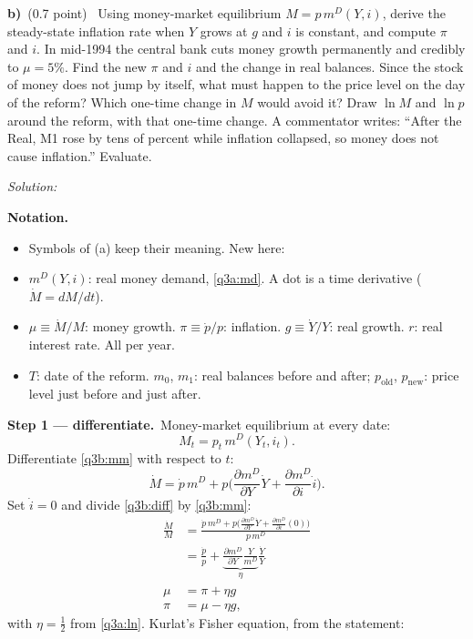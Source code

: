 \documentclass[11pt,a4paper]{article}
\newif\ifsolucoes
\newcommand{\espacoresol}{6cm}
\newcommand{\parte}[2]{\par\Needspace{6\baselineskip}\medskip\noindent\textbf{#1)}~(#2)~}
\newcommand{\resolespaco}{\ifsolucoes\else\par\textit{Solution:}\vspace{\espacoresol}\par\fi}
\newcommand{\passo}[2]{\par\smallskip\noindent\textbf{Step #1.}~#2}
\newenvironment{notacao}{\par\smallskip\noindent\textbf{Notation.}\begin{itemize}[leftmargin=1.4em,topsep=1pt,itemsep=0pt]\small}{\end{itemize}}
\begin{document}
\parte{b}{0.7 point} Using money-market equilibrium $M=p\,m^D(Y,i)$, derive the steady-state inflation rate when
$Y$ grows at $g$ and $i$ is constant, and compute $\pi$ and $i$. In mid-1994 the central bank cuts money growth
permanently and credibly to $\mu=5\%$. Find the new $\pi$ and $i$ and the change in real balances. Since the stock
of money does not jump by itself, what must happen to the price level on the day of the reform? Which one-time
change in $M$ would avoid it? Draw $\ln M$ and $\ln p$ around the reform, with that one-time change. A commentator
writes: ``After the Real, M1 rose by tens of percent while inflation collapsed, so money does not cause inflation.''
Evaluate.
\resolespaco
\begin{sol}
\begin{notacao}
\item Symbols of (a) keep their meaning. New here:
\item $m^D(Y,i)$: real money demand, \eqref{q3a:md}. A dot is a time derivative ($\dot M=dM/dt$).
\item $\mu\equiv\dot M/M$: money growth. $\pi\equiv\dot p/p$: inflation. $g\equiv\dot Y/Y$: real growth.
$r$: real interest rate. All per year.
\item $T$: date of the reform. $m_0$, $m_1$: real balances before and after; $p_{\text{old}}$, $p_{\text{new}}$:
price level just before and just after.
\end{notacao}
\passo{1 --- differentiate}{Money-market equilibrium at every date:
\begin{equation}
M_t=p_t\,m^D(Y_t,i_t). \label{q3b:mm}
\end{equation}
Differentiate \eqref{q3b:mm} with respect to $t$:
\begin{equation}
\dot M=\dot p\,m^D+p\Big(\frac{\partial m^D}{\partial Y}\dot Y+\frac{\partial m^D}{\partial i}\dot i\Big).
\label{q3b:diff}
\end{equation}
Set $\dot i=0$ and divide \eqref{q3b:diff} by \eqref{q3b:mm}:
\begin{align}
\frac{\dot M}{M} &= \frac{\dot p\,m^D+p\big(\frac{\partial m^D}{\partial Y}\dot Y+\frac{\partial m^D}{\partial i}(0)\big)}{p\,m^D}
\nonumber\\
&= \frac{\dot p}{p}+\underbrace{\frac{\partial m^D}{\partial Y}\frac{Y}{m^D}}_{\eta}
\frac{\dot Y}{Y}\nonumber\\
\mu &= \pi+\eta g\nonumber\\
\pi &= \mu-\eta g, \label{q3b:pi}
\end{align}
with $\eta=\tfrac12$ from \eqref{q3a:ln}. Kurlat's Fisher equation, from the statement:
}
\end{sol}
\end{document}
